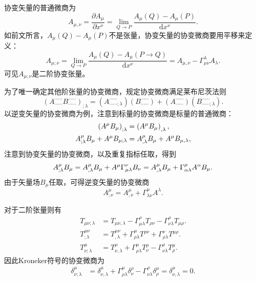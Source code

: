 \documentclass[11pt, a4paper, oneside, onecolumn]{ctexart}
\numberwithin{equation}{subsection}
\begin{document}
协变矢量的普通微商为
\begin{equation}
A_{\mu,\nu}=\frac{\partial{}A_{\mu}}{\partial{}x^{\nu}}=\lim_{Q\to P}\frac{A_{\mu}\left(Q\right)-A_{\mu}\left(P\right)}{\mathrm{d}x^{\nu}}.
\end{equation}
如前文所言，$A_{\mu}\left(Q\right)-A_{\mu}\left(P\right)$不是张量，协变矢量的协变微商要用平移来定义：
\begin{equation}
A_{\mu;\nu}=\lim_{Q\to P}\frac{A_{\mu}\left(Q\right)-A_{\mu}\left(P\to Q\right)}{\mathrm{d}x^{\nu}}=A_{\mu,\nu}-\Gamma_{\mu\nu}^{\lambda}A_{\lambda}.
\end{equation}
可见$A_{\mu;\nu}$是二阶协变张量。

为了唯一确定其他阶张量的协变微商，规定协变微商满足莱布尼茨法则
\begin{equation}
\left(A_{\cdots\cdots}^{\cdots\cdots}B_{\cdots\cdots}^{\cdots\cdots}\right)_{;\lambda}=\left(A_{\cdots\cdots;\lambda}^{\cdots\cdots}\right)\left(B_{\cdots\cdots}^{\cdots\cdots}\right)+\left(A_{\cdots\cdots}^{\cdots\cdots}\right)\left(B_{\cdots\cdots;\lambda}^{\cdots\cdots}\right).
\end{equation}
以逆变矢量的协变微商为例，注意到标量的协变微商是标量的普通微商：
\begin{align}
\left(A^{\mu}B_{\mu}\right)_{;\lambda}&=\left(A^{\mu}B_{\mu}\right)_{,\lambda},\\
A_{;\lambda}^{\mu}B_{\mu}+A^{\mu}B_{\mu;\lambda}&=A_{,\lambda}^{\mu}B_{\mu}+A^{\mu}B_{\mu,\lambda},\notag
\end{align}
注意到协变矢量的协变微商，以及重复指标任取，得到
\begin{equation}
A_{;\lambda}^{\mu}B_{\mu}=A_{,\lambda}^{\mu}B_{\mu}+A^{\mu}\Gamma_{\mu\lambda}^{\nu}B_{\nu}=A^{\mu}_{,\lambda}B_{\mu}+\Gamma_{\alpha\lambda}^{\mu}A^{\alpha}B_{\mu}.\notag
\end{equation}
由于矢量场$B_{\mu}$任取，可得逆变矢量的协变微商
\begin{equation}
A_{;\nu}^{\mu}=A_{,\nu}^{\mu}+\Gamma_{\lambda\nu}^{\mu}A^{\lambda}.
\end{equation}

对于二阶张量则有
\begin{align}
T_{\mu\nu;\lambda}&=T_{\mu\nu,\lambda}-\Gamma_{\mu\lambda}^{\rho}T_{\rho\nu}-\Gamma_{\nu\lambda}^{\rho}T_{\mu\rho}.\\
T_{;\lambda}^{\mu\nu}&=T_{,\lambda}^{\mu\nu}+\Gamma_{\rho\lambda}^{\mu}T^{\rho\nu}+\Gamma_{\rho\lambda}^{\nu}T^{\mu\rho}.\\
T_{\nu;\lambda}^{\mu}&=T_{\nu,\lambda}^{\mu}+\Gamma_{\rho\lambda}^{\mu}T_{\nu}^{\rho}-\Gamma_{\nu\lambda}^{\rho}T_{\rho}^{\mu}.
\end{align}
因此Kroneker符号的协变微商为
\begin{align}
\delta{}_{\nu;\lambda}^{\mu}&=\delta{}_{\nu,\lambda}^{\mu}+\Gamma_{\rho\lambda}^{\mu}\delta{}_{\nu}^{\rho}-\Gamma_{\nu\lambda}^{\rho}\delta{}_{\rho}^{\mu}=\delta{}_{\nu,\lambda}^{\mu}=0.
\end{align}
\end{document}

